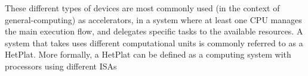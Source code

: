 \documentclass[main.tex]{subfiles}
\begin{document}
These different types of devices are most commonly used (in the context of general-computing) as accelerators, in a system where at least one \ac{CPU} manages the main execution flow, and delegates specific tasks to the available resources. A system that takes uses different computational units is commonly referred to as a \ac{HetPlat}. More formally, a \ac{HetPlat} can be defined as a computing system with processors using different \acp{ISA} 



\end{document}
